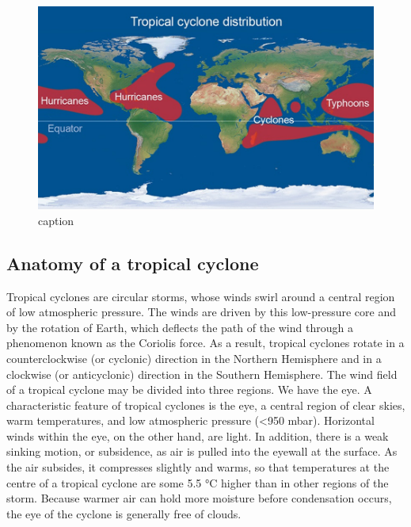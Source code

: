 \documentclass[12pt,oneside]{book}
\begin{document}
\begin{figure}

{\centering \includegraphics[width=0.8\linewidth]{figures/FigureE11} 

}

\caption{caption}\label{fig:TropicalCyclones}
\end{figure}

\subsection{Anatomy of a tropical
cyclone}\label{anatomy-of-a-tropical-cyclone}

Tropical cyclones are circular storms, whose winds swirl around a
central region of low atmospheric pressure. The winds are driven by this
low-pressure core and by the rotation of Earth, which deflects the path
of the wind through a phenomenon known as the Coriolis force. As a
result, tropical cyclones rotate in a counterclockwise (or cyclonic)
direction in the Northern Hemisphere and in a clockwise (or
anticyclonic) direction in the Southern Hemisphere. The wind field of a
tropical cyclone may be divided into three regions. We have the eye. A
characteristic feature of tropical cyclones is the eye, a central region
of clear skies, warm temperatures, and low atmospheric pressure
(\textless{}950 mbar). Horizontal winds within the eye, on the other
hand, are light. In addition, there is a weak sinking motion, or
subsidence, as air is pulled into the eyewall at the surface. As the air
subsides, it compresses slightly and warms, so that temperatures at the
centre of a tropical cyclone are some 5.5 °C higher than in other
regions of the storm. Because warmer air can hold more moisture before
condensation occurs, the eye of the cyclone is generally free of clouds.
\end{document}
